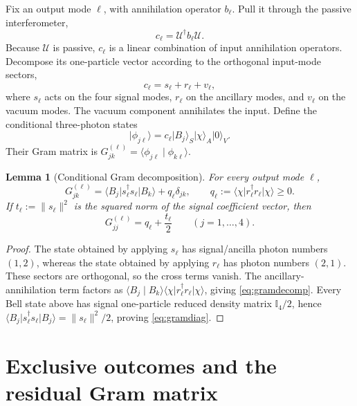 \documentclass[11pt]{article}
\newtheorem{lemma}[theorem]{Lemma}
\theoremstyle{remark}
\newcommand{\ket}[1]{\lvert #1\rangle}
\newcommand{\bra}[1]{\langle #1\rvert}
\newcommand{\braket}[2]{\langle #1\mid #2\rangle}
\newcommand{\norm}[1]{\lVert #1\rVert}
\newcommand{\Id}{\mathbb{I}}
\begin{document}
Fix an output mode \(\ell\), with annihilation operator \(b_\ell\). Pull it
through the passive interferometer,
\begin{equation}
  c_\ell=\mathcal U^\dagger b_\ell\mathcal U.
\end{equation}
Because \(\mathcal U\) is passive, \(c_\ell\) is a linear combination of input
annihilation operators. Decompose its one-particle vector according to the
orthogonal input-mode sectors,
\begin{equation}
  c_\ell=s_\ell+r_\ell+v_\ell,
\end{equation}
where \(s_\ell\) acts on the four signal modes, \(r_\ell\) on the ancillary
modes, and \(v_\ell\) on the vacuum modes. The vacuum component annihilates the
input. Define the conditional three-photon states
\begin{equation}
  \ket{\phi_{j\ell}}
   =c_\ell\ket{B_j}_S\ket\chi_A\ket0_V.
\end{equation}
Their Gram matrix is \(G^{(\ell)}_{jk}=\braket{\phi_{j\ell}}{\phi_{k\ell}}\).

\begin{lemma}[Conditional Gram decomposition]
\label{lem:gram}
For every output mode \(\ell\),
\begin{equation}
  G^{(\ell)}_{jk}
   =\bra{B_j}s_\ell^\dagger s_\ell\ket{B_k}
     +q_\ell\delta_{jk},
  \qquad
  q_\ell:=\bra\chi r_\ell^\dagger r_\ell\ket\chi\ge0.
  \label{eq:gramdecomp}
\end{equation}
If \(t_\ell:=\norm{s_\ell}^2\) is the squared norm of the signal coefficient
vector, then
\begin{equation}
  G^{(\ell)}_{jj}=q_\ell+\frac{t_\ell}{2}
  \qquad (j=1,\ldots,4).
  \label{eq:gramdiag}
\end{equation}
\end{lemma}

\begin{proof}
The state obtained by applying \(s_\ell\) has signal/ancilla photon numbers
\((1,2)\), whereas the state obtained by applying \(r_\ell\) has photon numbers
\((2,1)\). These sectors are orthogonal, so the cross terms vanish. The
ancillary-annihilation term factors as
\(\braket{B_j}{B_k}\bra\chi r_\ell^\dagger r_\ell\ket\chi\), giving
\cref{eq:gramdecomp}. Every Bell state above has signal one-particle reduced
density matrix \(\Id_4/2\), hence
\(\bra{B_j}s_\ell^\dagger s_\ell\ket{B_j}=\norm{s_\ell}^2/2\), proving
\cref{eq:gramdiag}.
\end{proof}

\section{Exclusive outcomes and the residual Gram matrix}
\label{sec:deletion}
\end{document}
